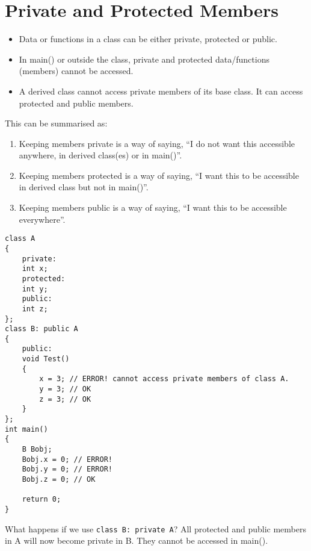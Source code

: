 \documentclass[12pt,a4paper]{article}
\begin{document}
\section{Private and Protected Members}
\begin{itemize}
\item Data or functions in a class can be either private, protected or public.
\item In main() or outside the class, private and protected data/functions (members) cannot be accessed.
\item A derived class cannot access private members of its base class. It can access protected and public members.
\end{itemize}
This can be summarised as:
\begin{enumerate}
\item Keeping members private is a way of saying, ``I do not want this accessible anywhere, in derived class(es) or in main()''.
\item Keeping members protected is a way of saying, ``I want this to be accessible in derived class but not in main()''.
\item Keeping members public is a way of saying, ``I want this to be accessible everywhere''.
\end{enumerate}
\begin{lstlisting}[caption={private and protected members}]
class A
{
	private:
	int x;
	protected:
	int y;
	public:
	int z;
};
class B: public A
{
	public:
	void Test()
	{
		x = 3; // ERROR! cannot access private members of class A.
		y = 3; // OK
		z = 3; // OK
	}
};
int main()
{
	B Bobj;
	Bobj.x = 0; // ERROR!
	Bobj.y = 0; // ERROR!
	Bobj.z = 0; // OK
	
	return 0;
}
\end{lstlisting}
What happens if we use \verb|class B: private A|? All protected and public members in A will now become private in B. They cannot be accessed in main().


\end{document}
